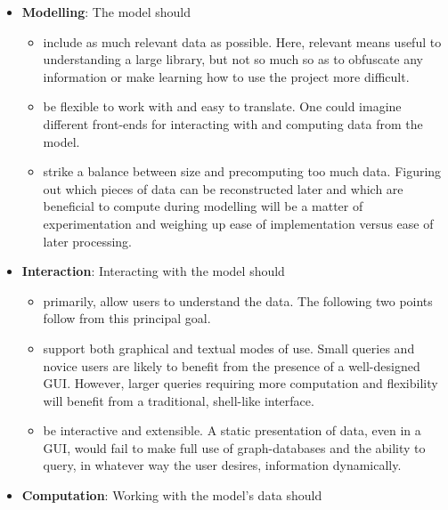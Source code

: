 \begin{itemize}

  \item \textbf{Modelling}: The model should
  \begin{itemize}

    \item include as much relevant data as possible. Here, relevant means
          useful to understanding a large library, but not so much so as to
          obfuscate any information or make learning how to use the project
          more difficult.

    \item be flexible to work with and easy to translate. One could imagine
          different front-ends for interacting with and computing data
          from the model.

    \item strike a balance between size and precomputing too much data.
          Figuring out which pieces of data can be reconstructed later and
          which are beneficial to compute during modelling will be a matter of
          experimentation and weighing up ease of implementation
          versus ease of later processing.

  \end{itemize}

  \item \textbf{Interaction}: Interacting with the model should
  \begin{itemize}

    \item primarily, allow users to understand the data. The following two points
          follow from this principal goal.

    \item support both graphical and textual modes of use. Small queries and
          novice users are likely to benefit from the presence of a well-designed
          GUI\@. However, larger queries requiring more computation and
          flexibility will benefit from a traditional, shell-like interface.

    \item be interactive and extensible. A static presentation of data, even in
          a GUI, would fail to make full use of graph-databases and the ability
          to query, in whatever way the user desires, information dynamically.

  \end{itemize}

  \item \textbf {Computation}: Working with the model's data should
  \begin{itemize}


\end{itemize}
\end{itemize}
